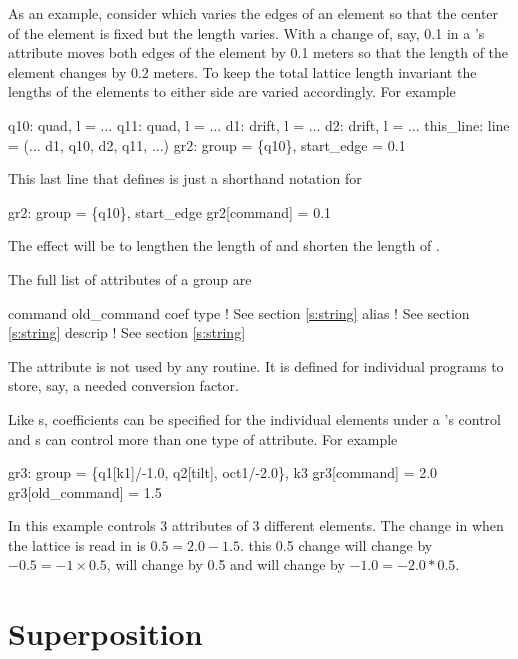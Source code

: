 As an example, consider  which varies the edges of
an element so that the center of the element is fixed but the length
varies. With  a change of, say, 0.1 in a
's  attribute moves both edges of the element by
0.1 meters so that the length of the element changes by 0.2 meters. To
keep the total lattice length invariant the lengths of the elements to
either side are varied accordingly.  For example
\begin{example}
  q10: quad, l = ...
  q11: quad, l = ...
  d1: drift, l = ...
  d2: drift, l = ...
  this_line: line = (... d1, q10, d2, q11, ...)
  gr2: group = \{q10\}, start_edge = 0.1
\end{example}
This last line that defines  is just a shorthand notation for
\begin{example}
  gr2: group = \{q10\}, start_edge 
  gr2[command] = 0.1
\end{example}
The effect will be to lengthen the length of  and shorten the
length of .

The full list of attributes of a group are
\begin{example}
  command         
  old_command     
  coef            
  type            ! See section \ref{s:string}
  alias           ! See section \ref{s:string}
  descrip         ! See section \ref{s:string}
\end{example}
The  attribute is not used by any \bmad routine. It is
defined for individual programs to store, say, a needed conversion
factor.

Like s, coefficients can be specified for the individual
elements under a 's control and s can control more
than one type of attribute. For example
\begin{example}
  gr3: group = \{q1[k1]/-1.0, q2[tilt], oct1/-2.0\}, k3
  gr3[command] = 2.0
  gr3[old_command] = 1.5
\end{example}
In this example  controls 3 attributes of 3 different
elements.  The change in  when the lattice is read in is $0.5
= 2.0 - 1.5$.  this 0.5 change will change  by $-0.5 = -1
\times 0.5$,  will change by 0.5 and  will
change by $-1.0 = -2.0 * 0.5$.

\section{Superposition}
\label{s:super}

